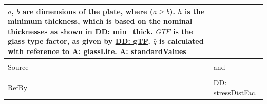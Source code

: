 \documentclass[12pt]{article}
\begin{document}
\begin{minipage}{\textwidth}
\begin{tabular}{p{} p{}}
                                                          $a$, $b$ are dimensions of the plate, where ($a\geq{}b$).
                                                          $h$ is the minimum thickness, which is based on the nominal thicknesses as shown in \hyperref[DD:min.thick]{DD: min\_thick}.
                                                          $GTF$ is the glass type factor, as given by \hyperref[DD:gTF]{DD: gTF}.
                                                          $\hat{q}$ is calculated with reference to \hyperref[assumpGL]{A: glassLite}.
                                                          \hyperref[assumpSV]{A: standardValues}
                                                          \\ \midrule \\
                                                          Source & \cite{astm2009} and \cite{campidelli}
                                                                   \\ \midrule \\
                                                                   RefBy & \hyperref[DD:stressDistFac]{DD: stressDistFac}.
\\ \bottomrule \end{tabular}
\end{minipage}
\par~
\end{document}
